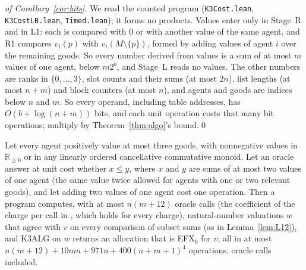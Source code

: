 \documentclass[runningheads,11pt]{llncs}
\newcommand{\efxz}{\texorpdfstring{\mbox{EFX$_0$}}{EFX0}}
\begin{document}
\begin{proof}[of Corollary~\ref{cor:bits}]
We read the counted program (\texttt{K3Cost.lean}, \texttt{K3CostLB.lean}, \texttt{Timed.lean}); it forms no products. Values enter only in Stage~R and in L1: each is compared with $0$ or with another value of the same agent, and R1 compares $v_i(p)$ with $v_i(M\setminus\{p\})$, formed by adding values of agent $i$ over the remaining goods. So every number derived from values is a sum of at most $m$ values of one agent, below $m2^b$, and Stage~L reads no values. The other numbers are ranks in $\{0,\dots,3\}$, slot counts and their sums (at most $2n$), list lengths (at most $n+m$) and block counters (at most $n$), and agents and goods are indices below $n$ and $m$. So every operand, including table addresses, has $O(b+\log(n+m))$ bits, and each unit operation costs that many bit operations; multiply by Theorem~\ref{thm:algo}'s bound.\qed
\end{proof}

\begin{corollary}\label{cor:real}
Let every agent positively value at most three goods, with nonnegative values in $\mathbb{R}_{\ge0}$ or in any linearly ordered cancellative commutative monoid. Let an oracle answer at unit cost whether $x\le y$, where $x$ and $y$ are sums of at most two values of one agent (the same value twice allowed for agents with one or two relevant goods), and let adding two values of one agent cost one operation. Then a program computes, with at most $n(m+12)$ oracle calls (the coefficient of the charge per call in , which holds for every charge), natural-number valuations $w$ that agree with $v$ on every comparison of subset sums (as in Lemma~\ref{lem:L12}), and K3ALG on $w$ returns an allocation that is \efxz{} for $v$; all in at most $n(m+12)+10nm+971n+400(n+m+1)^4$ operations, oracle calls included.
\end{corollary}
\end{document}
